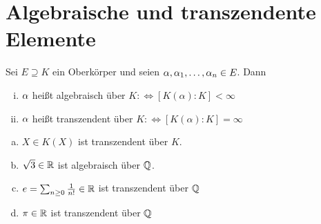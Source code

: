 \documentclass[a4paper]{report}
\begin{document}
\section{Algebraische und transzendente Elemente}
\begin{defi}
  Sei $E \supseteq K$ ein Oberkörper und seien $\alpha, \alpha_{1}, \ldots, \alpha_{n} \in E$. Dann
  \begin{enumerate}[(i)]
    \item $\alpha$ heißt algebraisch über $K:\iff [K(\alpha) : K] < \infty$
    \item $\alpha$ heißt transzendent über $K:\iff [K(\alpha) : K] = \infty$
  \end{enumerate}
\end{defi}
\begin{bspe*}\item
\begin{enumerate}[(a)]
  \item $X \in K(X)$ ist transzendent über $K$.
  \item $\sqrt 3 \in \mathbb{R}$ ist algebraisch über $\mathbb{Q}$.
  \item $e = \sum_{n \ge 0} \frac 1{n!} \in \mathbb{R}$ ist transzendent über $\mathbb{Q}$
  \item $\pi \in \mathbb{R}$ ist transzendent über $\mathbb{Q}$
\end{enumerate}
\end{bspe*}
\end{document}
